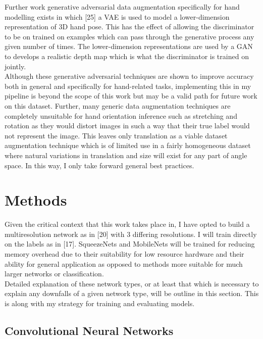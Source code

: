 \documentclass{article}
\begin{document}
Further work generative adversarial data augmentation specifically for hand modelling exists in which [25] a VAE is used to model a lower-dimension representation of 3D hand pose. This has the effect of allowing the discriminator to be on trained on examples which can pass through the generative process any given number of times. The lower-dimension representations are used by a GAN to develops a realistic depth map which is what the discriminator is trained on jointly. \\

Although these generative adversarial techniques are shown to improve accuracy both in general and specifically for hand-related tasks, implementing this in my pipeline is beyond the scope of this work but may be a valid path for future work on this dataset. Further, many generic data augmentation techniques are completely unsuitable for hand orientation inference such as stretching and rotation as they would distort images in such a way that their true label would not represent the image. This leaves only translation as a viable dataset augmentation technique which is of limited use in a fairly homogeneous dataset where natural variations in translation and size will exist for any part of angle space. In this way, I only take forward general best practices.

\section{Methods}

Given the critical context that this work takes place in, I have opted to build a multiresolution network as in [20] with 3 differing resolutions. I will train directly on the labels as in [17]. SqueezeNets and MobileNets will be trained for reducing memory overhead due to their suitability for low resource hardware and their ability for general application as opposed to methods more suitable for much larger networks or classification. \\

Detailed explanation of these network types, or at least that which is necessary to explain any downfalls of a given network type, will be outline in this section. This is along with my strategy for training and evaluating models. \\ 

\subsection{Convolutional Neural Networks}
\end{document}
